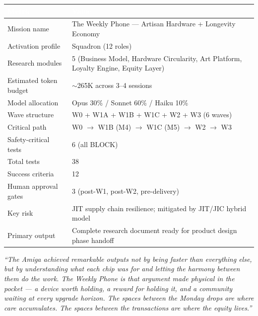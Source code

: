\documentclass[11pt,letterpaper]{article}
\newcommand{\tableheader}[1]{\textbf{\sffamily\textcolor{white}{#1}}}
\begin{document}
\begin{center}
\begin{tabularx}{\textwidth}{L{4cm}X}
\toprule
{}
\tableheader{Metric} & \tableheader{Value} \\
\midrule
Mission name & The Weekly Phone --- Artisan Hardware + Longevity Economy \\
Activation profile & Squadron (12 roles) \\
Research modules & 5 (Business Model, Hardware Circularity, Art Platform, Loyalty Engine, Equity Layer) \\
Estimated token budget & $\sim$265K across 3--4 sessions \\
Model allocation & Opus 30\% / Sonnet 60\% / Haiku 10\% \\
Wave structure & W0 + W1A + W1B + W1C + W2 + W3 (6 waves) \\
Critical path & W0 $\to$ W1B (M4) $\to$ W1C (M5) $\to$ W2 $\to$ W3 \\
Safety-critical tests & 6 (all BLOCK) \\
Total tests & 38 \\
Success criteria & 12 \\
Human approval gates & 3 (post-W1, post-W2, pre-delivery) \\
Key risk & JIT supply chain resilience; mitigated by JIT/JIC hybrid model \\
Primary output & Complete research document ready for product design phase handoff \\
\bottomrule
\end{tabularx}
\end{center}

\vspace{2em}
\begin{quotebox}
\textit{``The Amiga achieved remarkable outputs not by being faster than everything else, but by understanding what each chip was for and letting the harmony between them do the work. The Weekly Phone is that argument made physical in the pocket --- a device worth holding, a reward for holding it, and a community waiting at every upgrade horizon. The spaces between the Monday drops are where care accumulates. The spaces between the transactions are where the equity lives.''}

\vspace{0.5em}
\noindent{\small\sffamily\textcolor{subtlegray}{--- The Weekly Phone Vision Through-Line, GSD Ecosystem / March 2026}}
\end{quotebox}
\end{document}
